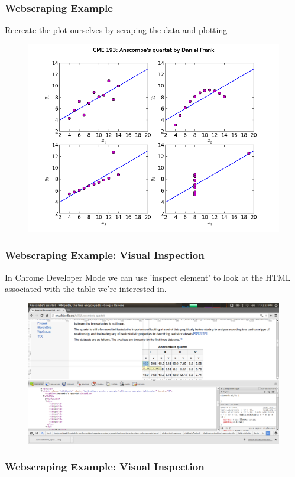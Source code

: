\documentclass{beamer}
\begin{document}
\begin{frame}
\frametitle{Webscraping Example}
Recreate the plot ourselves by scraping the data and plotting
\begin{figure}[h]
\centering
\includegraphics[width=.9\textwidth]{images/quartet.png}
\end{figure}
\end{frame}

\begin{frame}
\frametitle{Webscraping Example: Visual Inspection}
In Chrome Developer Mode we can use 'inspect element' to look at the HTML associated with the table we're interested in.

\begin{figure}[h]
\centering
\includegraphics[width=.9\textwidth]{images/chrome_devel.png}
\end{figure}
\end{frame}


\begin{frame}
\frametitle{Webscraping Example: Visual Inspection}
\lstset{basicstyle=\tiny}
\end{frame}
\end{document}
